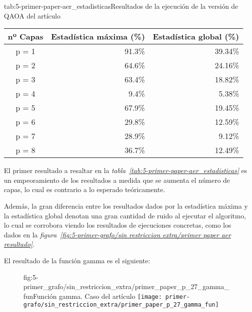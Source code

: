 \begin{table}[htbp]{tab:5-primer-paper-aer_estadisticas}{Resultados de la ejecución de la versión de QAOA del artículo}
  \centering
  \begin{tabular}{|c|r|r|}
    \hline
    \textbf{nº Capas} & \textbf{Estadística máxima (\%)} & \textbf{Estadística global (\%)} \\ \hline
    p = 1             & 91.3\%                           & 39.34\%                          \\ \hline
    p = 2             & 64.6\%                           & 24.16\%                          \\ \hline
    p = 3             & 63.4\%                           & 18.82\%                          \\ \hline
    p = 4             &  9.4\%                           &  5.38\%                          \\ \hline
    p = 5             & 67.9\%                           & 19.45\%                          \\ \hline
    p = 6             & 29.8\%                           & 12.59\%                          \\ \hline
    p = 7             & 28.9\%                           &  9.12\%                          \\ \hline
    p = 8             & 36.7\%                           & 12.49\%                          \\ \hline
  \end{tabular}
\end{table}

El primer resultado a resaltar en la \textit{tabla~\ref{tab:5-primer-paper-aer_estadisticas}} es un empeoramiento de los resultados a medida que se aumenta el número de capas, lo cual es contrario a lo esperado teóricamente.

Además, la gran diferencia entre los resultados dados por la estadística máxima y la estadística global denotan una gran cantidad de ruido al ejecutar el algoritmo, lo cual se corrobora viendo los resultados de ejecuciones concretas, como los dados en la \textit{figura~\ref{fig:5-primer-grafo/sin restriccion extra/primer paper aer resultado}}.

El resultado de la función gamma es el siguiente:
\begin{figure}[htbp]{fig:5-primer_grafo/sin_restriccion_extra/primer_paper_p_27_gamma_fun}{Función gamma. Caso del artículo}
  \centering
  \texttt{[image: primer-grafo/sin\_restriccion\_extra/primer\_paper\_p\_27\_gamma\_fun]}
\end{figure}

